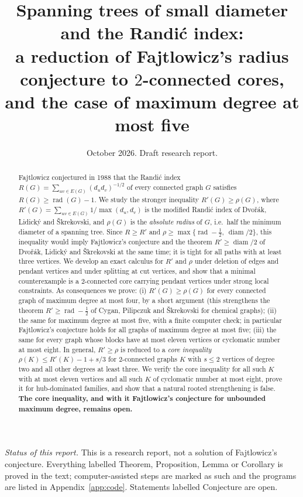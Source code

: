 \documentclass[11pt]{amsart}
\title[Spanning trees of small diameter and the Randi\'c index]{Spanning trees of small diameter and the Randi\'c index:\\
a reduction of Fajtlowicz's radius conjecture to $2$-connected cores,\\ and the case of maximum degree at most five}
\date{October 2026. Draft research report.}
\theoremstyle{definition}
\newcommand{\rad}{\operatorname{rad}}
\newcommand{\diam}{\operatorname{diam}}
\newcommand{\Rp}{R'}
\begin{document}
\begin{abstract}
Fajtlowicz conjectured in 1988 that the Randi\'c index $R(G)=\sum_{uv\in E(G)}(d_ud_v)^{-1/2}$ of every connected
graph $G$ satisfies $R(G)\ge\rad(G)-1$. We study the stronger inequality $\Rp(G)\ge\rho(G)$, where
$\Rp(G)=\sum_{uv\in E(G)}1/\max(d_u,d_v)$ is the modified Randi\'c index of Dvo\v{r}\'ak, Lidick\'y and
\v{S}krekovski, and $\rho(G)$ is the \emph{absolute radius} of $G$, i.e.\ half the minimum diameter of a spanning tree.
Since $R\ge\Rp$ and $\rho\ge\max\{\rad-\tfrac12,\ \diam/2\}$, this inequality would imply Fajtlowicz's conjecture
and the theorem $\Rp\ge\diam/2$ of Dvo\v{r}\'ak, Lidick\'y and \v{S}krekovski at the same time; it is tight for all
paths with at least three vertices. We develop an exact calculus for $\Rp$ and $\rho$ under deletion of edges and pendant vertices and under
splitting at cut vertices, and show that a minimal counterexample is a $2$-connected core carrying pendant
vertices under strong local constraints. As consequences we prove:
(i) $\Rp(G)\ge\rho(G)$ for every connected graph of maximum degree at most four, by a short argument (this
strengthens the theorem $\Rp\ge\rad-\frac12$ of Cygan, Pilipczuk and \v{S}krekovski for chemical graphs);
(ii) the same for maximum degree at most five, with a finite computer check; in particular Fajtlowicz's
conjecture holds for all graphs of maximum degree at most five;
(iii) the same for every graph whose blocks have at most eleven vertices or cyclomatic number at most eight.
In general, $\Rp\ge\rho$ is reduced to a \emph{core inequality} $\rho(K)\le\Rp(K)-1+s/3$ for $2$-connected graphs $K$
with $s\le2$ vertices of degree two and all other degrees at least three. We verify the core inequality for all such
$K$ with at most eleven vertices and all such $K$ of cyclomatic number at most eight, prove it for hub-dominated
families, and show that a natural rooted strengthening
is false. \textbf{The core inequality, and with it Fajtlowicz's conjecture for unbounded maximum degree, remains open.}
\end{abstract}

\maketitle

\noindent\emph{Status of this report.} This is a research report, not a solution of Fajtlowicz's conjecture.
Everything labelled Theorem, Proposition, Lemma or Corollary is proved in the text; computer-assisted steps are
marked as such and the programs are listed in Appendix~\ref{app:code}. Statements labelled Conjecture are open.
\end{document}
